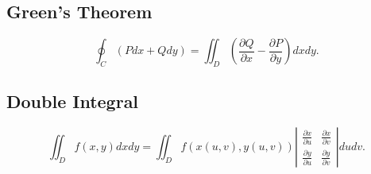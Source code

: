 \subsection{Green's Theorem}

$$\oint_C(Pdx+Qdy)=\iint_D(\frac{\partial Q}{\partial x}-\frac{\partial P}{\partial y})dxdy.$$

\subsection{Double Integral}

$$\iint_Df(x,y)dxdy=\iint_Df(x(u,v),y(u,v))
    \left|\begin{array}{cc}
        \frac{\partial x}{\partial u} & \frac{\partial x}{\partial v} \\
        \frac{\partial y}{\partial u} & \frac{\partial y}{\partial v}
    \end{array}\right|dudv.$$